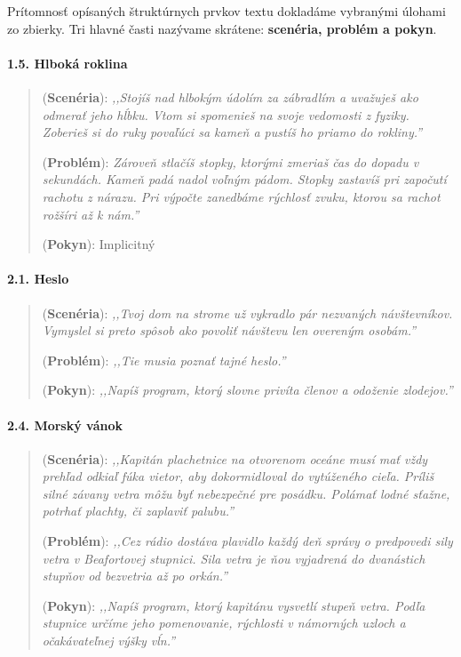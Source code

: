 Prítomnosť opísaných štruktúrnych prvkov textu dokladáme vybranými úlohami zo zbierky. Tri hlavné časti nazývame skrátene: \textbf{scenéria, problém a pokyn}.

\paragraph{1.5. Hlboká roklina}
\begin{quote}
(\textbf{Scenéria}): \textit{\small ,,Stojíš nad hlbokým údolím za zábradlím a uvažuješ ako odmerať jeho hĺbku. Vtom si spomenieš na svoje vedomosti z fyziky. Zoberieš si do ruky povaľúci sa kameň a pustíš ho priamo do rokliny.''}

(\textbf{Problém}):  \textit{\small Zároveň stlačíš stopky, ktorými zmeriaš čas do dopadu v sekundách. Kameň padá nadol voľným pádom. Stopky zastavíš pri započutí rachotu z nárazu.
Pri výpočte zanedbáme rýchlosť zvuku, ktorou sa rachot rožšíri až k nám.''}

(\textbf{Pokyn}): Implicitný
\end{quote}

\paragraph{2.1. Heslo}
\begin{quote}
(\textbf{Scenéria}): \textit{\small ,,Tvoj dom na strome už vykradlo pár nezvaných návštevníkov. Vymyslel si preto spôsob ako povoliť návštevu len overeným osobám.''}

(\textbf{Problém}): \textit{\small ,,Tie musia poznať tajné heslo.''}

(\textbf{Pokyn}): \textit{\small ,,Napíš program, ktorý slovne privíta členov a odoženie zlodejov.''}
\end{quote}

\paragraph{2.4. Morský vánok}
\begin{quote}
(\textbf{Scenéria}): \textit{\small ,,Kapitán plachetnice na otvorenom oceáne musí mať vždy prehľad odkiaľ fúka vietor, aby dokormidloval do vytúženého cieľa. Príliš silné závany vetra môžu byť nebezpečné pre posádku. Polámať lodné sťažne, potrhať plachty, či zaplaviť palubu.''}

(\textbf{Problém}): \textit{\small ,,Cez rádio dostáva plavidlo každý deň správy o predpovedi sily vetra v Beafortovej stupnici. Sila vetra je ňou vyjadrená do dvanástich stupňov od bezvetria až po orkán.''}

(\textbf{Pokyn}): \textit{\small ,,Napíš program, ktorý kapitánu vysvetlí stupeň vetra. Podľa stupnice určíme jeho pomenovanie, rýchlosti v námorných uzloch a očakávateľnej výšky vĺn.''}
\end{quote}

